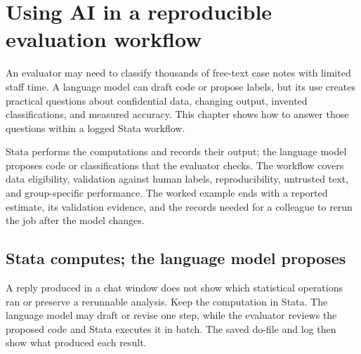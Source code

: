 \documentclass[
    a4paper,
    fontsize=10pt,
    twoside=true,
    numbers=noenddot,
]{kaobook}
\begin{document}

\chapter{Using AI in a reproducible evaluation workflow}\label{ch:ai}

An evaluator may need to classify thousands of free-text case notes with limited staff time. A language model can draft code or propose labels, but its use creates practical questions about confidential data, changing output, invented classifications, and measured accuracy. This chapter shows how to answer those questions within a logged Stata workflow.

Stata performs the computations and records their output; the language model proposes code or classifications that the evaluator checks. The workflow covers data eligibility, validation against human labels, reproducibility, untrusted text, and group-specific performance. The worked example ends with a reported estimate, its validation evidence, and the records needed for a colleague to rerun the job after the model changes.

\section{Stata computes; the language model proposes}\label{sec:backbone}
A reply produced in a chat window does not show which statistical operations ran or preserve a rerunnable analysis. Keep the computation in Stata. The language model may draft or revise one step, while the evaluator reviews the proposed code and Stata executes it in batch. The saved do-file and log then show what produced each result.
\end{document}
